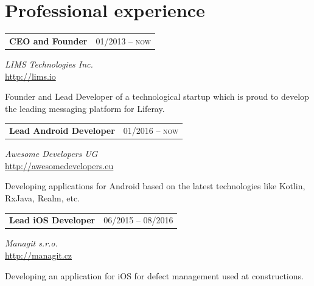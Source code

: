 \documentclass[10pt]{article} %
\begin{document}
\begin{minipage}[t]{0.44\textwidth} %
\vspace{122pt} %
	
	

\section{Professional experience} 
\medskip

\begin{tabularx}{\textwidth}{@{}Xr@{}}
\large\textbf{CEO and Founder} & \small\textsc{01/2013 -- now} \\
\end{tabularx}
\normalsize\textit{LIMS Technologies Inc.}\\
\normalsize\url{http://lims.io}

\medskip
\normalsize {Founder and Lead Developer of a technological startup which is proud to 
develop the leading messaging platform for Liferay.}\\
\medskip 


\begin{tabularx}{\textwidth}{@{}Xr@{}}
\large\textbf{Lead Android Developer} & \small\textsc{01/2016 -- now} \\
\end{tabularx}
\normalsize\textit{Awesome Developers UG}\\
\normalsize\url{http://awesomedevelopers.eu}

\medskip
\normalsize {Developing applications for Android based on the latest \newline technologies like Kotlin, RxJava,
Realm, etc.}\\
\medskip 


\begin{tabularx}{\textwidth}{@{}Xr@{}}
\large\textbf{Lead iOS Developer} & \small\textsc{06/2015 -- 08/2016} \\
\end{tabularx}
\normalsize\textit{Managit s.r.o.}\\
\normalsize\url{http://managit.cz}

\medskip
\normalsize {Developing an application for iOS for \newline defect management used at constructions.}\\
\medskip 


\end{minipage}
\end{document}
